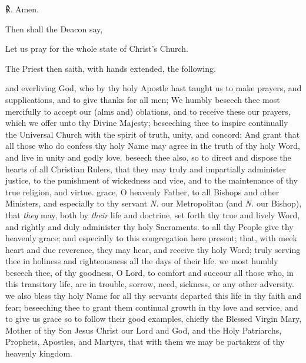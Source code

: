 ℟. Amen.
\begin{rubric}
    Then shall the Deacon say,
\end{rubric}
\centerline{Let us pray for the whole state of Christ's Church.}
\begin{rubric}
    The Priest then saith, with hands extended, the following.
\end{rubric}
 and everliving God, who by thy holy Apostle hast taught us to make prayers, and supplications, and to give thanks for all men; We humbly beseech thee most mercifully to accept our (alms and) oblations, and to receive these our prayers, which we offer unto thy Divine Majesty; beseeching thee to inspire continually the Universal Church with the spirit of truth, unity, and concord: And grant that all those who do confess thy holy Name may agree in the truth of thy holy Word, and live in unity and godly love.
 beseech thee also, so to direct and dispose the hearts of all Christian Rulers, that they may truly and impartially administer justice, to the punishment of wickedness and vice, and to the maintenance of thy true religion, and virtue.
 grace, O heavenly Father, to all Bishops and other Ministers, and especially to thy servant \emph{N.} our Metropolitan (and \emph{N.} our Bishop), that \textit{they} may, both by \textit{their} life and doctrine, set forth thy true and lively Word, and rightly and duly administer thy holy Sacraments.
 to all thy People give thy heavenly grace; and especially to this congregation here present; that, with meek heart and due reverence, they may hear, and receive thy holy Word; truly serving thee in holiness and righteousness all the days of their life.
 we most humbly beseech thee, of thy goodness, O Lord, to comfort and succour all those who, in this transitory life, are in trouble, sorrow, need, sickness, or any other adversity.
 we also bless thy holy Name for all thy servants departed this life in thy faith and fear; beseeching thee to grant them continual growth in thy love and service, and to give us grace so to follow their good examples, chiefly the Blessed Virgin Mary, Mother of thy Son Jesus Christ our Lord and God, and the Holy Patriarchs, Prophets, Apostles, and Martyrs, that with them we may be partakers of thy heavenly kingdom.
